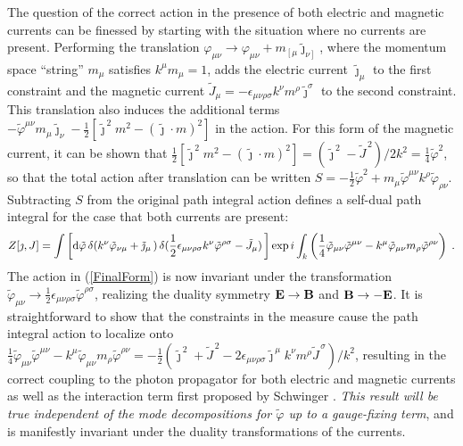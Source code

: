 \documentclass[a4paper,a4paper]{article}
\begin{document}
The question of the correct action in the presence of both electric and magnetic currents can be finessed by starting with the situation where no currents are present. Performing the translation $\varphi_{\mu \nu} \rightarrow \varphi_{\mu \nu} + m_{\left[ \mu \right.} \tilde{\jmath}_{\left. \nu \right]}$, where the momentum space ``string''  $m_\mu$ satisfies $k^\mu m_\mu = 1$, adds the electric current $\tilde{\jmath}_\mu$ to the first constraint and the magnetic current $\tilde{J}_\mu =  - \epsilon_{\mu \nu \rho \sigma} k^\nu m^\rho \tilde{\jmath}^\sigma$ to the second constraint.  This translation also induces the additional terms $ - \tilde{\varphi}^{\mu \nu} m_\mu \tilde{\jmath}_\nu - \frac{1}{2} \left[ \tilde{\jmath}^{\, 2} m^2 - (\tilde{\jmath} \cdot m )^2 \right]$ in the action.  For this form of the magnetic current, it can be shown that  $\frac{1}{2} \left[ \tilde{\jmath}^{\, 2} m^2 - (\tilde{\jmath} \cdot m)^2  \right] = ( \tilde{\jmath}^{\, 2} - \tilde{J}^{\, 2})/2k^2 =  \frac{1}{4} \tilde{\varphi}^2$, so that the total action after translation can be written $S = - \frac{1}{2} \tilde{\varphi}^2 +  m_\mu \tilde{\varphi}^{\mu \nu} k^\rho \tilde{\varphi}_{\rho \nu}$. Subtracting $S$ from the original path integral action defines a self-dual path integral for the case that both currents are present:
\begin{equation}
\label{FinalForm}
Z[ \jmath, J ]  = \int \left[ {\rm d} \tilde{\varphi} \,  \delta( k^\nu \tilde{\varphi}_{\nu \mu} + \tilde{\jmath}_\mu \,) \, \delta ( \frac{1}{2} \epsilon_{\mu \nu \rho \sigma} k^\nu \tilde{\varphi}^{\rho \sigma} - \tilde{J}_\mu ) \, \right] \exp i \int_k  \left( \frac{1}{4} \tilde{\varphi}_{\mu \nu} \tilde{\varphi}^{\mu \nu} - k^\mu \tilde{\varphi}_{\mu \nu} m_\rho \tilde{\varphi}^{ \rho \nu}   \right) \; .
\end{equation}
The action in (\ref{FinalForm}) is now invariant under the transformation $\tilde{\varphi}_{\mu \nu} \rightarrow  \frac{1}{2} \epsilon_{\mu \nu \rho \sigma} \tilde{\varphi}^{\rho \sigma}$,  realizing the duality symmetry ${\bf E} \rightarrow {\bf B}$ and ${\bf B} \rightarrow - {\bf E}$. It is straightforward to show that the constraints in the measure cause the path integral action to localize onto $ \frac{1}{4} \tilde{\varphi}_{\mu \nu} \tilde{\varphi}^{\mu \nu} - k^\mu \tilde{\varphi}_{\mu \nu} m_\rho \tilde{\varphi}^{ \rho \nu} = - \frac{1}{2} (\tilde{\jmath}^{\, 2} + \tilde{J}^{\, 2} - 2 \epsilon_{\mu \nu \rho \sigma} \tilde{\jmath}^{\, \mu} k^\nu m^\rho \tilde{J}^{\, \sigma})/ k^2$, resulting in the correct coupling to the photon propagator for both electric and magnetic currents as well as the interaction term first proposed by Schwinger \cite{Schwinger}.  {\it This result will be true independent of the mode decompositions for $\tilde{\varphi}$ up to a gauge-fixing term}, and is manifestly invariant under the duality transformations of the currents.
\end{document}
